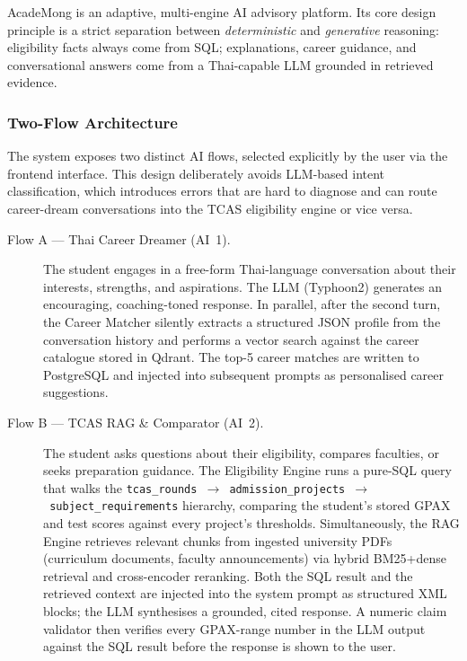 ﻿\documentclass[12pt,a4paper]{article}
\begin{document}
AcadeMong is an adaptive, multi-engine AI advisory platform. Its core
design principle is a strict separation between \emph{deterministic} and
\emph{generative} reasoning: eligibility facts always come from SQL; explanations,
career guidance, and conversational answers come from a Thai-capable LLM grounded
in retrieved evidence.

\subsubsection{Two-Flow Architecture}

The system exposes two distinct AI flows, selected explicitly by the user via the
frontend interface. This design deliberately avoids LLM-based intent classification,
which introduces errors that are hard to diagnose and can route career-dream
conversations into the TCAS eligibility engine or vice versa.

\begin{description}
    \item[Flow A — Thai Career Dreamer (AI~1).] The student engages in a free-form
    Thai-language conversation about their interests, strengths, and aspirations. The
    LLM (Typhoon2) generates an encouraging, coaching-toned response. In parallel,
    after the second turn, the Career Matcher silently extracts a structured JSON
    profile from the conversation history and performs a vector search against the
    career catalogue stored in Qdrant. The top-5 career matches are written to
    PostgreSQL and injected into subsequent prompts as personalised career
    suggestions.

    \item[Flow B — TCAS RAG \& Comparator (AI~2).] The student asks questions about
    their eligibility, compares faculties, or seeks preparation guidance. The
    Eligibility Engine runs a pure-SQL query that walks the
    \texttt{tcas\_rounds~$\to$~admission\_projects~$\to$~subject\_requirements}
    hierarchy, comparing the student's stored GPAX and test scores against every
    project's thresholds. Simultaneously, the RAG Engine retrieves relevant chunks
    from ingested university PDFs (curriculum documents, faculty announcements) via
    hybrid BM25+dense retrieval and cross-encoder reranking. Both the SQL result and
    the retrieved context are injected into the system prompt as structured XML
    blocks; the LLM synthesises a grounded, cited response. A numeric claim
    validator then verifies every GPAX-range number in the LLM output against the
    SQL result before the response is shown to the user.
\end{description}
\end{document}
